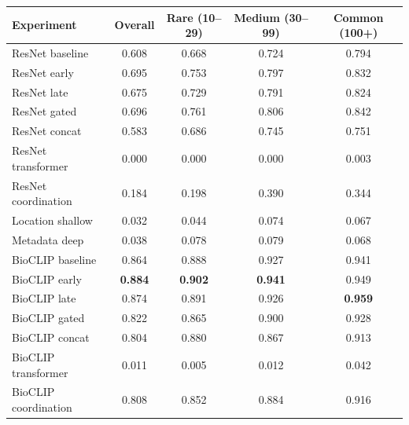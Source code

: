 \begin{tabular}{lcccc}
\toprule
Experiment & Overall & Rare (10--29) & Medium (30--99) & Common (100+) \\
\midrule
ResNet baseline & 0.608 & 0.668 & 0.724 & 0.794 \\
ResNet early & 0.695 & 0.753 & 0.797 & 0.832 \\
ResNet late & 0.675 & 0.729 & 0.791 & 0.824 \\
ResNet gated & 0.696 & 0.761 & 0.806 & 0.842 \\
ResNet concat & 0.583 & 0.686 & 0.745 & 0.751 \\
ResNet transformer & 0.000 & 0.000 & 0.000 & 0.003 \\
ResNet coordination & 0.184 & 0.198 & 0.390 & 0.344 \\
Location shallow & 0.032 & 0.044 & 0.074 & 0.067 \\
Metadata deep & 0.038 & 0.078 & 0.079 & 0.068 \\
BioCLIP baseline & 0.864 & 0.888 & 0.927 & 0.941 \\
BioCLIP early & \textbf{0.884} & \textbf{0.902} & \textbf{0.941} & 0.949 \\
BioCLIP late & 0.874 & 0.891 & 0.926 & \textbf{0.959} \\
BioCLIP gated & 0.822 & 0.865 & 0.900 & 0.928 \\
BioCLIP concat & 0.804 & 0.880 & 0.867 & 0.913 \\
BioCLIP transformer & 0.011 & 0.005 & 0.012 & 0.042 \\
BioCLIP coordination & 0.808 & 0.852 & 0.884 & 0.916 \\
\bottomrule
\end{tabular}
